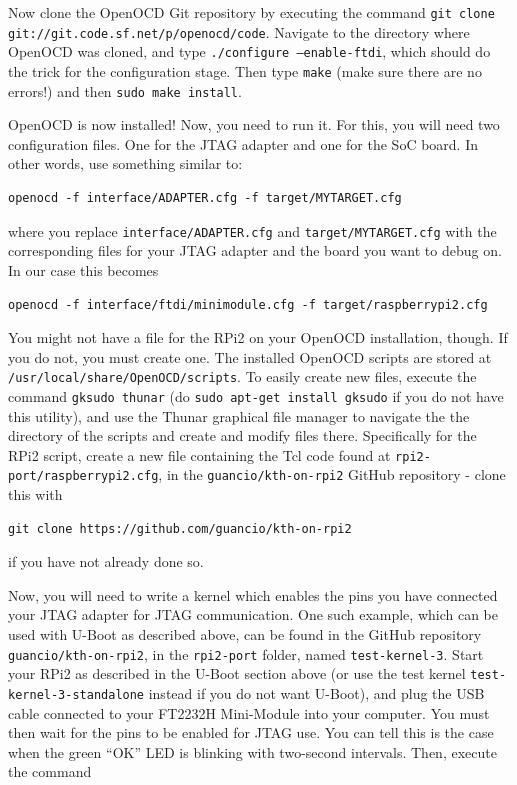 \documentclass[a4paper,11pt,reqno]{amsart}
\begin{document}
{Now clone the OpenOCD Git repository by executing the command \texttt{git clone git://git.code.sf.net/p/openocd/code}. Navigate to the directory where OpenOCD was cloned, and type \texttt{./configure --enable-ftdi}, which should do the trick for the configuration stage. Then type \texttt{make} (make sure there are no errors!) and then \texttt{sudo make install}.

OpenOCD is now installed! Now, you need to run it. For this, you will need two configuration files. One for the JTAG adapter and one for the SoC board. In other words, use something similar to:

\begin{verbatim}
openocd -f interface/ADAPTER.cfg -f target/MYTARGET.cfg
\end{verbatim}

where you replace \texttt{interface/ADAPTER.cfg} and \texttt{target/MYTARGET.cfg} with the corresponding files for your JTAG adapter and the board you want to debug on. In our case this becomes

\begin{verbatim}
openocd -f interface/ftdi/minimodule.cfg -f target/raspberrypi2.cfg
\end{verbatim}

You might not have a file for the RPi2 on your OpenOCD installation, though. If you do not, you must create one. The installed OpenOCD scripts are stored at \texttt{/usr/local/share/OpenOCD/scripts}. To easily create new files, execute the command \texttt{gksudo thunar} (do \texttt{sudo apt-get install gksudo} if you do not have this utility), and use the Thunar graphical file manager to navigate the the directory of the scripts and create and modify files there. Specifically for the RPi2 script, create a new file containing the Tcl code found at \texttt{rpi2-port/raspberrypi2.cfg}, in the \texttt{guancio/kth-on-rpi2} GitHub repository - clone this with

\begin{verbatim}
git clone https://github.com/guancio/kth-on-rpi2
\end{verbatim}

if you have not already done so.

Now, you will need to write a kernel which enables the pins you have connected your JTAG adapter for JTAG communication. One such example, which can be used with U-Boot as described above, can be found in the GitHub repository \texttt{guancio/kth-on-rpi2}, in the \texttt{rpi2-port} folder, named \texttt{test-kernel-3}. Start your RPi2 as described in the U-Boot section above (or use the test kernel \texttt{test-kernel-3-standalone} instead if you do not want U-Boot), and plug the USB cable connected to your FT2232H Mini-Module into your computer. You must then wait for the pins to be enabled for JTAG use. You can tell this is the case when the green ``OK'' LED is blinking with two-second intervals. Then, execute the command

}
\end{document}
